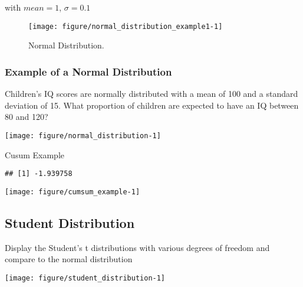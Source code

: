 \documentclass[a4paper,10pt]{book}\usepackage[]{graphicx}\usepackage[]{color}
\makeatletter
\def\maxwidth{ %
  \ifdim\Gin@nat@width>\linewidth
    \linewidth
  \else
    \Gin@nat@width
  \fi
}
\newenvironment{kframe}{%
 \def\at@end@of@kframe{}%
 \ifinner\ifhmode%
  \def\at@end@of@kframe{\end{minipage}}%
  \begin{minipage}{\columnwidth}%
 \fi\fi%
 \def\FrameCommand##1{\hskip\@totalleftmargin \hskip-\fboxsep
 \colorbox{shadecolor}{##1}\hskip-\fboxsep
     \hskip-\linewidth \hskip-\@totalleftmargin \hskip\columnwidth}%
 \MakeFramed {\advance\hsize-\width
   \@totalleftmargin\z@ \linewidth\hsize
   \@setminipage}}%
 {\par\unskip\endMakeFramed%
 \at@end@of@kframe}
\newenvironment{knitrout}{}{} %
\makeatother
\begin{document}
with $ mean = 1 $, $ \sigma = 0.1 $

\begin{figure}
\begin{center}
\begin{knitrout}
\color{fgcolor}
\texttt{[image: figure/normal\_distribution\_example1-1]} 

\end{knitrout}
\caption{Normal Distribution.}
\end{center}
\end{figure}

\subsubsection*{Example of a Normal Distribution}

Children's IQ scores are normally distributed with a
mean of 100 and a standard deviation of 15. What
proportion of children are expected to have an IQ between
80 and 120?

\begin{knitrout}
\color{fgcolor}
\texttt{[image: figure/normal\_distribution-1]} 

\end{knitrout}


Cusum Example 

\begin{knitrout}
\color{fgcolor}\begin{kframe}
\begin{verbatim}
## [1] -1.939758
\end{verbatim}
\end{kframe}
\texttt{[image: figure/cumsum\_example-1]} 

\end{knitrout}

\subsection*{Student Distribution}

Display the Student's t distributions with various
degrees of freedom and compare to the normal distribution

\begin{knitrout}
\color{fgcolor}
\texttt{[image: figure/student\_distribution-1]} 

\end{knitrout}
\end{document}
